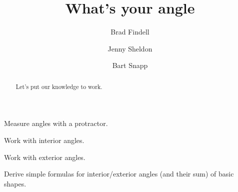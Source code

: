 \documentclass[nooutcomes,noauthor,hints,12pt,handout]{ximera}
\title{What's your angle}
\author{Brad Findell \and Jenny Sheldon \and Bart Snapp}
\begin{document}
\begin{abstract}
  Let's put our knowledge to work. 
\end{abstract}
\maketitle


\begin{listOutcomes}
\item Measure angles with a protractor.
\item Work with interior angles.
\item Work with exterior angles.
\item Derive simple formulas for interior/exterior angles (and their
  sum) of basic shapes.
\end{listOutcomes}

\mynewpage



 
       
\end{document}
